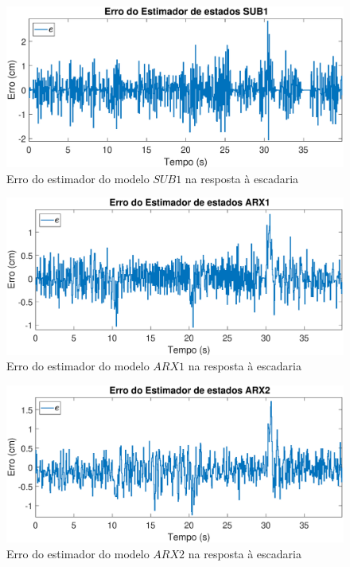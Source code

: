 \begin{figure}
	\centering
	\includegraphics[width=1\linewidth]{errosub1}
	\caption[Erro do estimador do modelo $SUB1$ na resposta à escadaria]{Erro do estimador do modelo $SUB1$ na resposta à escadaria}
	\label{fig:errosub1}
\end{figure}

\begin{figure}
	\centering
	\includegraphics[width=1\linewidth]{erroarx1}
	\caption[Erro do estimador do modelo $ARX1$ na resposta à escadaria]{Erro do estimador do modelo $ARX1$ na resposta à escadaria}
	\label{fig:erroarx1}
\end{figure}

\begin{figure}
	\centering
	\includegraphics[width=1\linewidth]{erroarx2}
	\caption[Erro do estimador do modelo $ARX2$ na resposta à escadaria]{Erro do estimador do modelo $ARX2$ na resposta à escadaria}
	\label{fig:erroarx2}
\end{figure}


